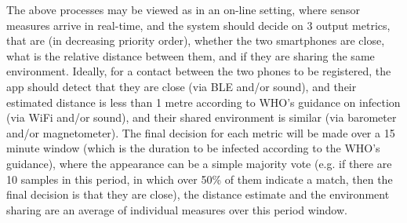 \documentclass[graybox]{svmult}
\begin{document}
The above processes may be viewed as in an on-line setting, where sensor measures arrive in real-time, and the system should decide on 3 output metrics, that are (in decreasing priority order), whether the two smartphones are close, what is the relative distance between them, and if they are sharing the same environment. Ideally, for a contact between the two phones to be registered, the app should detect that they are close (via BLE and/or sound), and their estimated distance is less than 1 metre according to WHO's guidance on infection (via WiFi and/or sound), and their shared environment is similar (via barometer and/or magnetometer). The final decision for each metric will be made over a 15 minute window (which is the duration to be infected according to the WHO's guidance), where the appearance can be a simple majority vote (e.g. if there are 10 samples in this period, in which over 50\% of them indicate a match, then the final decision is that they are close), the distance estimate and the environment sharing are an average of individual measures over this period window.
\end{document}
